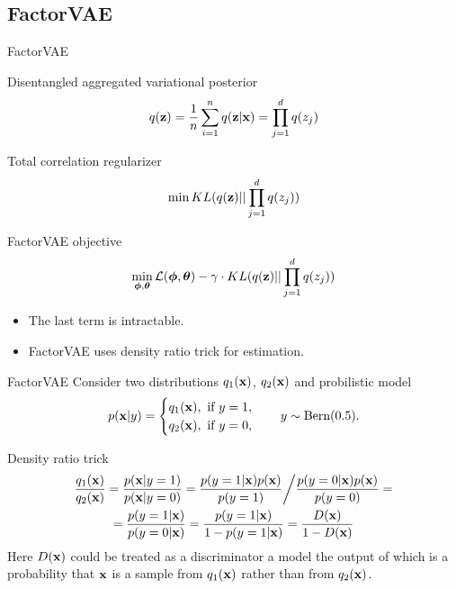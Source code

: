 \subsection{FactorVAE}
\begin{frame}{FactorVAE}
	\begin{block}{Disentangled aggregated variational posterior}
		\vspace{-0.3cm}
		\[
			q(\mathbf{z}) = \frac{1}{n} \sum_{i=1}^n q(\mathbf{z} | \mathbf{x}) = \prod_{j=1}^d q(z_j)
		\]
		\vspace{-0.3cm}
	\end{block}
	\begin{block}{Total correlation regularizer}
		\vspace{-0.3cm}
		\[
		\min KL(q(\mathbf{z}) || \prod_{j=1}^d q(z_j))
		\]
		\vspace{-0.3cm}
	\end{block}
	\begin{block}{FactorVAE objective}
		\vspace{-0.3cm}
		\[
		\min_{\boldsymbol{\phi}, \boldsymbol{\theta}} \mathcal{L}(\boldsymbol{\phi}, \boldsymbol{\theta}) - \gamma \cdot KL(q(\mathbf{z}) || \prod_{j=1}^d q(z_j))
		\]
		\vspace{-0.3cm}
	\end{block}
	\begin{itemize}
		\item The last term is intractable.
		\item FactorVAE uses density ratio trick for estimation. 
	\end{itemize}

\end{frame}
\begin{frame}{FactorVAE}
	Consider two distributions $q_1(\mathbf{x})$, $q_2(\mathbf{x})$ and probilistic model
	\[
		p(\mathbf{x} | y) = \begin{cases}
			q_1(\mathbf{x}), \text{ if } y = 1, \\
			q_2(\mathbf{x}), \text{ if } y = 0,
		\end{cases}
		\quad 
		y \sim \text{Bern}(0.5).
	\]
	\begin{block}{Density ratio trick}
		\vspace{-0.5cm}
		\begin{multline*}
			\frac{q_1(\mathbf{x})}{q_2(\mathbf{x})} = \frac{p(\mathbf{x} | y = 1)}{p(\mathbf{x} | y = 0)} = \frac{p(y = 1 | \mathbf{x}) p(\mathbf{x})}{p(y=1)} \bigg/ \frac{p(y = 0 | \mathbf{x}) p(\mathbf{x})}{p(y=0)} = \\
			= \frac{p(y = 1 | \mathbf{x})}{p(y = 0 | \mathbf{x})} = \frac{p(y = 1 | \mathbf{x})}{1 - p(y = 1 | \mathbf{x})} = \frac{D(\mathbf{x})}{1 - D(\mathbf{x})}
		\end{multline*}
	Here $D(\mathbf{x})$ could be treated as a discriminator a model the output of which is a probability that $\mathbf{x}$ is a sample
	from $q_1(\mathbf{x})$ rather than from $q_2(\mathbf{x})$.
	\end{block}

\end{frame}
